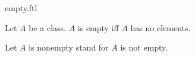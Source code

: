\documentclass{article}
\begin{document}
\begin{smodule}[creators={Marcel Schütz}]{empty.ftl}

  \begin{fdefinition*}[label=6252477624090624]
    Let $A$ be a class.
    $A$ is empty iff $A$ has no elements.
  \end{fdefinition*}

  \begin{fconvention*}
    Let $A$ is nonempty stand for $A$ is not empty.
  \end{fconvention*}
\end{smodule}
\end{document}
